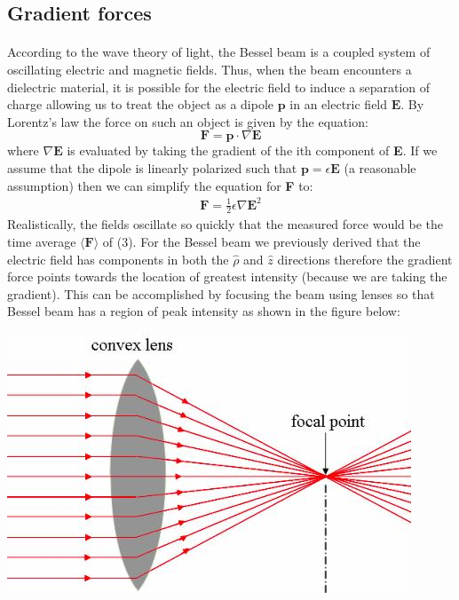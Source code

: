 \documentclass[a4paper, 11pt]{article}
\begin{document}
\subsection*{Gradient forces} 
\paragraph{}  
	According to the wave theory of light, the Bessel beam is a coupled system of oscillating electric and magnetic fields. Thus, when the beam encounters a dielectric material, it is possible for the electric field to induce a separation of charge allowing us to treat the object as a dipole $\mathbf{p}$ in an electric field $\mathbf{E}$. By Lorentz's law the force on such an object is given by the equation:
		\begin{equation}
			\mathbf{F} = \mathbf{p} \cdot \nabla\mathbf{E} 
		\end{equation}
	where $\nabla \mathbf{E}$ is evaluated by taking the gradient of the ith component of \textbf{E}. If we assume that the dipole is linearly polarized such that $\mathbf{p} = \epsilon\mathbf{E}$ (a reasonable assumption) then we can simplify the equation for \textbf{F} to: 
		\begin{eqnarray}
			\mathbf{F} = \frac{1}{2}\epsilon\nabla\mathbf{E}^2
		\end{eqnarray}
	Realistically, the fields oscillate so quickly that the measured force would be the time average $\langle \mathbf{F} \rangle$ of (3). For the Bessel beam we previously derived that the electric field has components in both the $\hat{\rho}$ and $\hat{z}$ directions therefore the gradient force points towards the location of greatest intensity (because we are taking the gradient). This can be accomplished by focusing the beam using lenses so that Bessel beam has a region of peak intensity as shown in the figure below: 
		\begin{center}
			\includegraphics[scale=0.5]{focusedBeam}
		\end{center}
	
\end{document}
